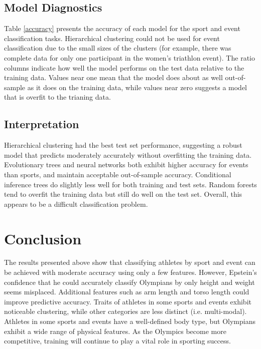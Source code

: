 \documentclass[12pt,letterpaper]{article} %
\begin{document}
\subsection{Model Diagnostics}
\label{diagnostics}

Table \ref{accuracy} presents the accuracy of each model for the sport and event classification tasks. Hierarchical clustering could not be used for event classification due to the small sizes of the clusters (for example, there was complete data for only one participant in the women's triathlon event). The ratio columns indicate how well the model performs on the test data relative to the training data. Values near one mean that the model does about as well out-of-sample as it does on the training data, while values near zero suggests a model that is overfit to the trianing data.



\subsection{Interpretation}

Hierarchical clustering had the best test set performance, suggesting a robust model that predicts moderately accurately without overfitting the training data. Evolutionary trees and neural networks both exhibit higher accuracy for events than sports, and maintain acceptable out-of-sample accuracy. Conditional inference trees do slightly less well for both training and test sets. Random forests tend to overfit the training data but still do well on the test set. Overall, this appears to be a difficult classification problem.



\section{Conclusion}

The results presented above show that classifying athletes by sport and event can be achieved with moderate accuracy using only a few features. However, Epstein's confidence that he could accurately classify Olympians by only height and weight seems misplaced. Additional features such as arm length and torso length could improve predictive accuracy. Traits of athletes in some sports and events exhibit noticeable clustering, while other categories are less distinct (i.e. multi-modal). Athletes in some sports and events have a well-defined body type, but Olympians exhibit a wide range of physical features. As the Olympics become more competitive, training will continue to play a vital role in sporting success.
\end{document}
